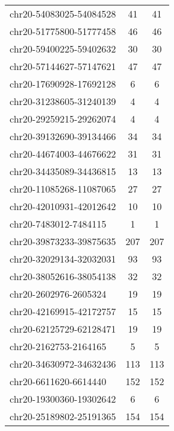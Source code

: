 \begin{longtable}{lSS}
	chr20-54083025-54084528 & 41   & 41                              \\
	chr20-51775800-51777458 & 46   & 46                              \\
	chr20-59400225-59402632 & 30   & 30                              \\
	chr20-57144627-57147621 & 47   & 47                              \\
	chr20-17690928-17692128 & 6    & 6                               \\
	chr20-31238605-31240139 & 4    & 4                               \\
	chr20-29259215-29262074 & 4    & 4                               \\
	chr20-39132690-39134466 & 34   & 34                              \\
	chr20-44674003-44676622 & 31   & 31                              \\
	chr20-34435089-34436815 & 13   & 13                              \\
	chr20-11085268-11087065 & 27   & 27                              \\
	chr20-42010931-42012642 & 10   & 10                              \\
	chr20-7483012-7484115   & 1    & 1                               \\
	chr20-39873233-39875635 & 207  & 207                             \\
	chr20-32029134-32032031 & 93   & 93                              \\
	chr20-38052616-38054138 & 32   & 32                              \\
	chr20-2602976-2605324   & 19   & 19                              \\
	chr20-42169915-42172757 & 15   & 15                              \\
	chr20-62125729-62128471 & 19   & 19                              \\
	chr20-2162753-2164165   & 5    & 5                               \\
	chr20-34630972-34632436 & 113  & 113                             \\
	chr20-6611620-6614440   & 152  & 152                             \\
	chr20-19300360-19302642 & 6    & 6                               \\
	chr20-25189802-25191365 & 154  & 154                             \\

\end{longtable}
